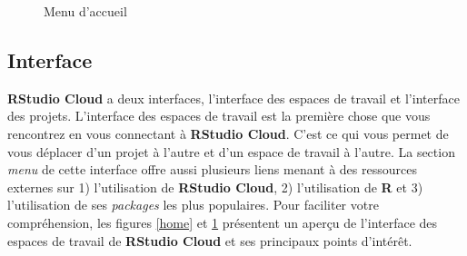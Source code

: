 \documentclass[10.5pt,a4paper]{article}
\begin{document}
\begin{figure}[H]
  \centering
  \caption{Menu d'accueil}
  \label{homeMenu}
\end{figure}

\subsection{Interface}
  \textbf{RStudio Cloud} a deux interfaces, l'interface des espaces de travail et l'interface des projets. L'interface des espaces de travail est la première chose que vous rencontrez en vous connectant à \textbf{RStudio Cloud}. C'est ce qui vous permet de vous déplacer d'un projet à l'autre et d'un espace de travail à l'autre. La section \emph{menu} de cette interface offre aussi plusieurs liens menant à des ressources externes sur 1) l'utilisation de \textbf{RStudio Cloud}, 2) l'utilisation de \textbf{R} et 3) l'utilisation de ses \emph{packages} les plus populaires. Pour faciliter votre compréhension, les figures \ref{home} et \ref{homeMenu} présentent un aperçu de l'interface des espaces de travail de \textbf{RStudio Cloud} et ses principaux points d'intérêt.
\end{document}
